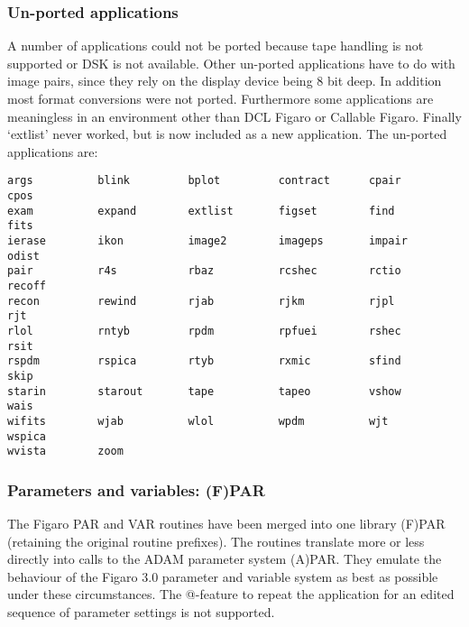 
\subsubsection{\label{changessub4}Un-ported applications}

   A number of applications could not be ported because tape handling is
   not supported or DSK is not available.  Other un-ported applications
   have to do with image pairs, since they rely on the display device
   being 8 bit deep.  In addition most format conversions were not
   ported. Furthermore some applications are meaningless in an
   environment other than DCL Figaro or Callable Figaro.  Finally
   `extlist' never worked, but is now included as a new application. The
   un-ported applications are:

\begin{verbatim}
args          blink         bplot         contract      cpair         cpos
exam          expand        extlist       figset        find          fits
ierase        ikon          image2        imageps       impair        odist
pair          r4s           rbaz          rcshec        rctio         recoff
recon         rewind        rjab          rjkm          rjpl          rjt
rlol          rntyb         rpdm          rpfuei        rshec         rsit
rspdm         rspica        rtyb          rxmic         sfind         skip
starin        starout       tape          tapeo         vshow         wais
wifits        wjab          wlol          wpdm          wjt           wspica
wvista        zoom
\end{verbatim}


\subsubsection{\label{changessub5}Parameters and variables: (F)PAR}

   The Figaro PAR and VAR routines have been merged into one library
   (F)PAR (retaining the original routine prefixes). The routines
   translate more or less directly into calls to the ADAM parameter
   system (A)PAR. They emulate the behaviour of the Figaro 3.0 parameter
   and variable system as best as possible under these circumstances.
   The @-feature to repeat the application for an edited sequence of
   parameter settings is not supported.

